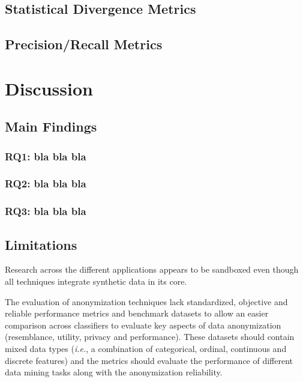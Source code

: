\documentclass[parskip=full]{scrartcl}
\begin{document}
\subsection{Statistical Divergence Metrics} 

\subsection{Precision/Recall Metrics}

\section{Discussion}

\subsection{Main Findings}

\subsubsection{RQ1: bla bla bla}

\subsubsection{RQ2: bla bla bla}

\subsubsection{RQ3: bla bla bla}

\subsection{Limitations}

Research across the different applications appears to be sandboxed even though
all techniques integrate synthetic data in its core.

The evaluation of anonymization techniques lack standardized, objective and
reliable performance metrics and benchmark datasets to allow an easier
comparison across classifiers to evaluate key aspects of data anonymization
(resemblance, utility, privacy and performance). These datasets should contain
mixed data types (\textit{i.e.}, a combination of categorical, ordinal,
continuous and discrete features) and the metrics should evaluate the
performance of different data mining tasks along with the anonymization
reliability.
\end{document}
